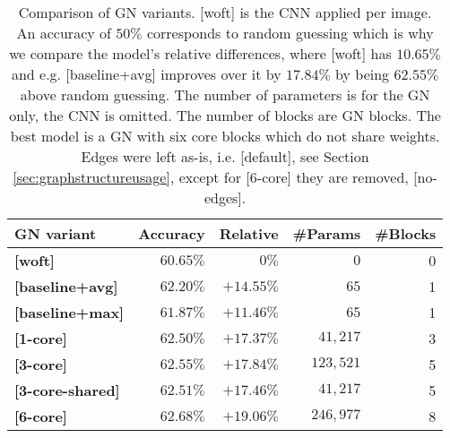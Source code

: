 \begin{table}
    \centering
    \begin{tabular}{lrrrr}
        \textbf{GN variant} & \textbf{Accuracy} & \textbf{Relative} & \textbf{\#Params} & \textbf{\#Blocks}\\\hline
        \textbf{[woft]}         & $60.65\%$ & $0\%$ & $0$ & 0 \\
        \textbf{[baseline+avg]} & $62.20\%$ & $+14.55\%$ & $65$ & 1\\
        \textbf{[baseline+max]} & $61.87\%$ & $+11.46\%$ & $65$ & 1\\
        \textbf{[1-core]}       & $62.50\%$ & $+17.37\%$ & $41,217$ & 3\\
        \textbf{[3-core]}       & $62.55\%$ & $+17.84\%$ & $123,521$ & 5\\
        \textbf{[3-core-shared]}& $62.51\%$ & $+17.46\%$ & $41,217$ & 5\\
        \textbf{[6-core]}       & $\bm{62.68\%}$ & $\bm{+19.06\%}$ & $246,977$ & 8\\
    \end{tabular}
    \caption[Comparison of GN variants]{Comparison of GN variants. [woft] is the CNN applied per image. An accuracy of $50\%$ corresponds to random guessing which is why we compare the model's relative differences, where [woft] has $10.65\%$ and e.g. [baseline+avg] improves over it by $17.84\%$ by being $62.55\%$ above random guessing. The number of parameters is for the GN only, the CNN is omitted. The number of blocks are GN blocks. The best model is a GN with six core blocks which do not share weights. Edges were left as-is, i.e. [default], see Section \ref{sec:graphstructureusage}, except for [6-core] they are removed, [no-edges].}
    \label{tab:gnvariantscomparison}
\end{table}


